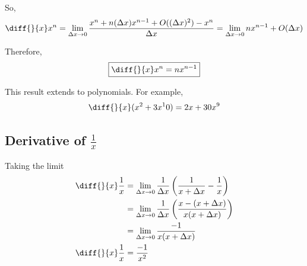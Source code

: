 So, $$ \diff{}{x} x^n = \lim_{\Delta x \to 0} \frac{x^n + n(\Delta x)x^{n-1} + O((\Delta x)^2) - x^n}{\Delta x} = \lim_{\Delta x \to 0} nx^{n-1} + O(\Delta x) $$

Therefore, $$ \boxed{ \diff{}{x} x^n = nx^{n-1} } $$

This result extends to polynomials. For example, $$ \diff{}{x}(x^2+3x^10) = 2x + 30x^9 $$

\subsection{Derivative of $\frac{1}{x}$}
Taking the limit
\begin{equation*}
\begin{split}
	\diff{}{x} \frac{1}{x} 
		& = \lim_{\Delta x \to 0} \frac{1}{\Delta x} \left( \frac{1}{x+\Delta x} - \frac{1}{x} \right) \\
		& = \lim_{\Delta x \to 0} \frac{1}{\Delta x} \left( \frac{x - (x+\Delta x)}{x(x+\Delta x)} \right) \\
		& = \lim_{\Delta x \to 0} \frac{-1}{x(x+\Delta x)} \\
	\diff{}{x} \frac{1}{x} & = \frac{-1}{x^2}
\end{split}
\end{equation*}
